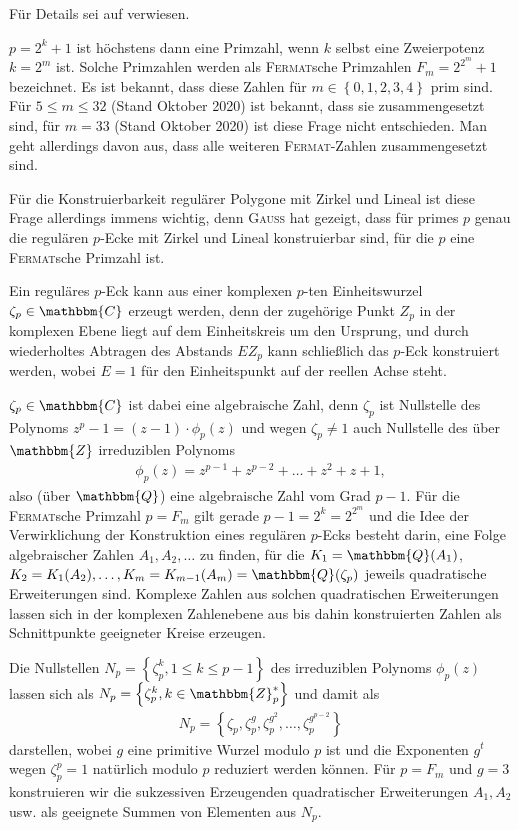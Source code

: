 \documentclass[11pt]{article}
\newcommand{\cbr}[1]{\ensuremath{\left\{#1\right\}}}
\newcommand{\Z}{\mathbbm{Z}}
\newcommand{\Q}{\mathbbm{Q}}
\newcommand{\C}{\mathbbm{C}}
\begin{document}
Für Details sei auf \cite{Graebe2012} verwiesen. 

$p=2^k+1$ ist höchstens dann eine Primzahl, wenn $k$ selbst eine Zweierpotenz
$k=2^m$ ist.  Solche Primzahlen werden als \textsc{Fermat}sche Primzahlen
$F_m=2^{2^m}+1$ bezeichnet. Es ist bekannt, dass diese Zahlen für
$m\in\cbr{0,1,2,3,4}$ prim sind. Für $5\le m\le 32$ (Stand Oktober 2020) ist
bekannt, dass sie zusammengesetzt sind, für $m=33$ (Stand Oktober 2020) ist
diese Frage nicht entschieden.  Man geht allerdings davon aus, dass alle
weiteren \textsc{Fermat}-Zahlen zusammengesetzt sind.

Für die Konstruierbarkeit regulärer Polygone mit Zirkel und Lineal ist diese
Frage allerdings immens wichtig, denn \textsc{Gauß} hat gezeigt, dass für
primes $p$ genau die regulären $p$-Ecke mit Zirkel und Lineal konstruierbar
sind, für die $p$ eine \textsc{Fermat}sche Primzahl ist.

Ein reguläres $p$-Eck kann aus einer komplexen $p$-ten Einheitswurzel
$\zeta_p\in\C$ erzeugt werden, denn der zugehörige Punkt $Z_p$ in der
komplexen Ebene liegt auf dem Einheitskreis um den Ursprung, und durch
wiederholtes Abtragen des Abstands $EZ_p$ kann schließlich das $p$-Eck
konstruiert werden, wobei $E=1$ für den Einheitspunkt auf der reellen Achse
steht.

$\zeta_p\in\C$ ist dabei eine algebraische Zahl, denn $\zeta_p$ ist Nullstelle
des Polynoms $z^p-1=(z-1)\cdot \phi_p(z)$ und wegen $\zeta_p\neq 1$ auch
Nullstelle des über $\Z$ irreduziblen Polynoms
\begin{gather*}
  \phi_p(z)=z^{p-1}+z^{p-2}+\dots+z^2+z+1,
\end{gather*}
also (über $\Q$) eine algebraische Zahl vom Grad $p-1$.  Für die
\textsc{Fermat}sche Primzahl $p=F_m$ gilt gerade $p-1=2^k=2^{2^m}$ und die
Idee der Verwirklichung der Konstruktion eines regulären $p$-Ecks besteht
darin, eine Folge algebraischer Zahlen $A_1, A_2,\ldots$ zu finden, für die
$K_1=\Q(A_1)$, $K_2=K_1(A_2), \ldots, K_m=K_{m-1}(A_m)=\Q(\zeta_p)$ jeweils
quadratische Erweiterungen sind. Komplexe Zahlen aus solchen quadratischen
Erweiterungen lassen sich in der komplexen Zahlenebene aus bis dahin
konstruierten Zahlen als Schnittpunkte geeigneter Kreise erzeugen.

Die Nullstellen $N_p=\cbr{\zeta_p^k, 1\le k\le p-1}$ des irreduziblen Polynoms
$\phi_p(z)$ lassen sich als $N_p=\cbr{\zeta_p^k, k\in\Z_p^\ast}$ und damit als
\begin{gather*}
  N_p=\cbr{\zeta_p,\zeta_p^g, \zeta_p^{g^2}, \dots, \zeta_p^{g^{p-2}}}
\end{gather*}
darstellen, wobei $g$ eine primitive Wurzel modulo $p$ ist und die Exponenten
$g^t$ wegen $\zeta_p^p=1$ natürlich modulo $p$ reduziert werden können.  Für
$p=F_m$ und $g=3$ konstruieren wir die sukzessiven Erzeugenden quadratischer
Erweiterungen $A_1, A_2$ usw. als geeignete Summen von Elementen aus $N_p$.
\end{document}
